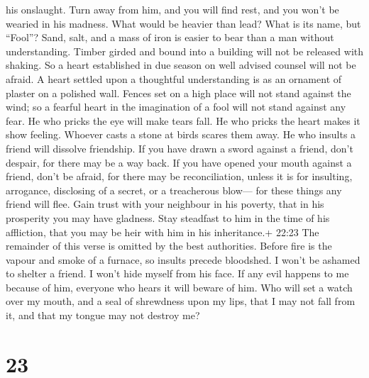 his onslaught. Turn away from him, and you will find rest, and you won't
be wearied in his madness.  What would be heavier than
lead? What is its name, but ``Fool''?  Sand, salt, and a
mass of iron is easier to bear than a man without understanding.
 Timber girded and bound into a building will not be
released with shaking. So a heart established in due season on well
advised counsel will not be afraid.  A heart settled upon a
thoughtful understanding is as an ornament of plaster on a polished
wall.  Fences set on a high place will not stand against
the wind; so a fearful heart in the imagination of a fool will not stand
against any fear.  He who pricks the eye will make tears
fall. He who pricks the heart makes it show feeling. 
Whoever casts a stone at birds scares them away. He who insults a friend
will dissolve friendship.  If you have drawn a sword
against a friend, don't despair, for there may be a way back.
 If you have opened your mouth against a friend, don't be
afraid, for there may be reconciliation, unless it is for insulting,
arrogance, disclosing of a secret, or a treacherous blow--- for these
things any friend will flee.  Gain trust with your
neighbour in his poverty, that in his prosperity you may have gladness.
Stay steadfast to him in the time of his affliction, that you may be
heir with him in his inheritance.+ 22:23 The remainder of this verse is
omitted by the best authorities.  Before fire is the vapour
and smoke of a furnace, so insults precede bloodshed.  I
won't be ashamed to shelter a friend. I won't hide myself from his face.
 If any evil happens to me because of him, everyone who
hears it will beware of him.  Who will set a watch over my
mouth, and a seal of shrewdness upon my lips, that I may not fall from
it, and that my tongue may not destroy me?

\hypertarget{section-5}{%
\section{23}\label{section-5}}

